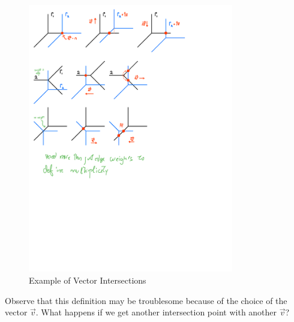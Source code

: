 \documentclass[12pt]{memoir}
\theoremstyle{definition}
\begin{document}
\begin{figure}[h!]
    \centering
    \includegraphics[width=0.8\textwidth, trim= 0.1cm 23.25cm 5cm 0.25cm,clip]{figs/fig11-3-4-and-5-VectorIntersections.pdf}
    \caption{Example of Vector Intersections}
    \label{fig:11.3-VectorIntersection1}
\end{figure} 

Observe that this definition may be troublesome because of the choice of the vector $\vec v$. What happens if we get another intersection point with another $\vec v$?
\end{document}
